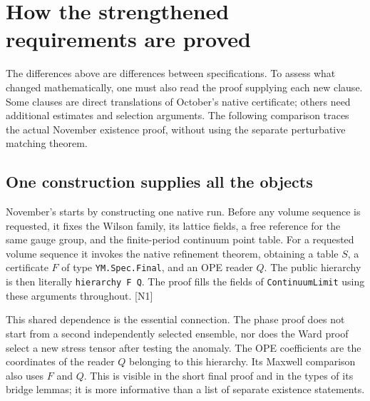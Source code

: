\documentclass[11pt]{article}
\newcommand{\code}[1]{{\small\nolinkurl{#1}}}
\newcommand{\src}[1]{\textsf{[#1]}}
\begin{document}
\section{How the strengthened requirements are proved}
\label{sec:proofs}

The differences above are differences between specifications. To assess
what changed mathematically, one must also read the proof supplying each
new clause. Some clauses are direct translations of October's native
certificate; others need additional estimates and selection arguments.
The following comparison traces the actual November existence proof,
without using the separate perturbative matching theorem.

\subsection{One construction supplies all the objects}

November's  starts by constructing
one native run. Before any volume sequence is requested, it fixes the
Wilson family, its lattice fields, a free reference for the same gauge
group, and the finite-period continuum point table. For a requested volume
sequence it invokes the native refinement theorem, obtaining a table $S$,
a certificate $F$ of type \code{YM.Spec.Final}, and an OPE reader $Q$.
The public hierarchy is then literally \code{hierarchy F Q}. The proof
fills the fields of \code{ContinuumLimit} using these arguments throughout.
\src{N1}

This shared dependence is the essential connection. The phase proof does
not start from a second independently selected ensemble, nor does the Ward
proof select a new stress tensor after testing the anomaly. The OPE
coefficients are the coordinates of the reader $Q$ belonging to this
hierarchy. Its Maxwell comparison also uses $F$ and $Q$. This is visible in
the short final proof and in the types of its bridge lemmas; it is more
informative than a list of separate existence statements.
\end{document}
